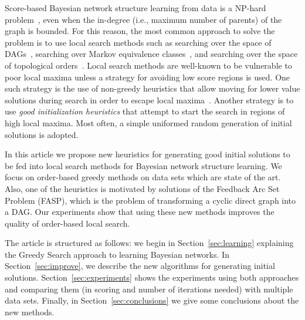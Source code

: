 Score-based Bayesian network structure learning from data is a NP-hard problem~\cite{MSResearch04}, even when the in-degree (i.e., maximum number of parents) of the graph is bounded. For this reason, the most common approach to solve the problem is to use local search methods such as searching over the space of DAGs~\cite{FNP99}, searching over Markov equivalence classes~\cite{Maxwell02}, and searching over the space of topological orders~\cite{TK05}. Local search methods are well-known to be vulnerable to poor local maxima unless a strategy for avoiding low score regions is used. One such strategy is the use of non-greedy heuristics that allow moving for lower value solutions during search in order to escape local maxima~\cite{ENF02}. Another strategy is to use \emph{good initialization heuristics} that attempt to start the search in regions of high local maxima. Most often, a simple uniformed random generation of initial solutions is adopted.

In this article we propose new heuristics for generating good initial solutions to be fed into local search methods for Bayesian network structure learning. We focus on order-based greedy methods on data sets which are state of the art. Also, one of the heuristics is motivated by solutions of the Feedback Arc Set Problem (FASP), which is the problem of transforming a cyclic direct graph into a DAG. Our experiments show that using these new methods improves the quality of order-based local search.

The article is structured as follows: we begin in Section~\ref{sec:learning} explaining the Greedy Search approach to learning Bayesian networks. In Section~\ref{sec:improve}, we describe the new algorithms for generating initial solutions. Section~\ref{sec:experiments} shows the experiments using both approaches and comparing them (in scoring and number of iterations needed) with multiple data sets. Finally, in Section~\ref{sec:conclusions} we give
some conclusions about the new methods.
